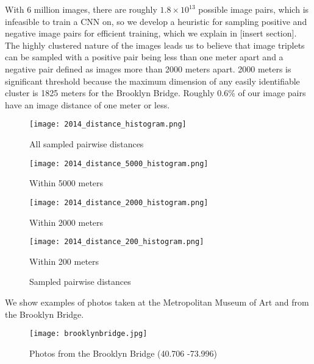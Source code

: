 \documentclass[pageno]{jpaper}
\begin{document}
With 6 million images, there are roughly $1.8\times 10^{13}$ possible image pairs, which is infeasible to train a CNN on, so we develop a heuristic for sampling positive and negative image pairs for efficient training, which we explain in [insert section].\\

The highly clustered nature of the images leads us to believe that image triplets can be sampled with a positive pair being less than one meter apart and a negative pair defined as images more than 2000 meters apart. 2000 meters is significant threshold because the maximum dimension of any easily identifiable cluster is 1825 meters for the Brooklyn Bridge. Roughly 0.6\% of our image pairs have an image distance of one meter or less.\\

\begin{figure}[!htbp] 
  \label{ fig7} 
  \begin{minipage}[b]{0.5\linewidth}
    \centering
    \texttt{[image: 2014\_distance\_histogram.png]} 
    \caption{All sampled pairwise distances} 
    \vspace{4ex}
  \end{minipage}%
  \begin{minipage}[!htbp]{0.5\linewidth}
    \centering
    \texttt{[image: 2014\_distance\_5000\_histogram.png]} 
    \caption{Within 5000 meters} 
    \vspace{4ex}
  \end{minipage} 
  \begin{minipage}[!htbp]{0.5\linewidth}
    \centering
    \texttt{[image: 2014\_distance\_2000\_histogram.png]} 
    \caption{Within 2000 meters} 
    \vspace{4ex}
  \end{minipage}%
  \begin{minipage}[!htbp]{0.5\linewidth}
    \centering
    \texttt{[image: 2014\_distance\_200\_histogram.png]} 
    \caption{Within 200 meters} 
    \vspace{4ex}
  \end{minipage} 
  \caption{Sampled pairwise distances}
\end{figure}

We show examples of photos taken at the Metropolitan Museum of Art and from the Brooklyn Bridge.\\

\begin{figure}[!htbp]
  \centering
  \texttt{[image: brooklynbridge.jpg]}
  \caption{Photos from the Brooklyn Bridge (40.706 -73.996)}
  \label{fig:brooklynbridge}
\end{figure}
\end{document}
